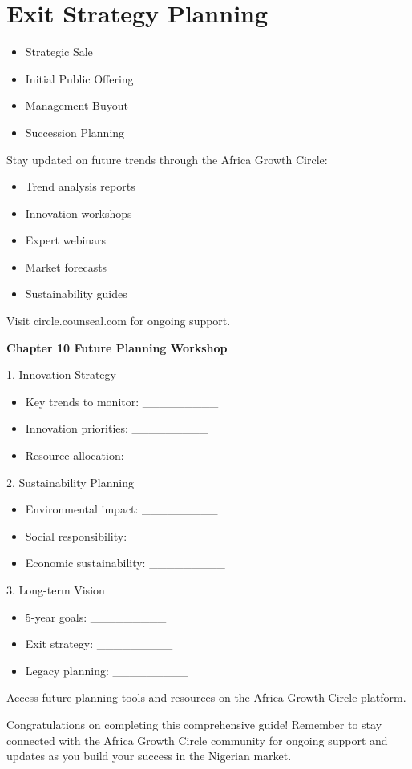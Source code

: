 \section{Exit Strategy Planning}

\begin{tcolorbox}[colback=white,colframe=primarydark,title=\textbf{Exit Options Analysis}]
\begin{itemize}
    \item Strategic Sale
    \item Initial Public Offering
    \item Management Buyout
    \item Succession Planning
\end{itemize}
\end{tcolorbox}

\begin{communitybox}
Stay updated on future trends through the Africa Growth Circle:
\begin{itemize}
    \item Trend analysis reports
    \item Innovation workshops
    \item Expert webinars
    \item Market forecasts
    \item Sustainability guides
\end{itemize}
Visit circle.counseal.com for ongoing support.
\end{communitybox}

\begin{workshopbox}
\textbf{Chapter 10 Future Planning Workshop}

1. Innovation Strategy
\begin{itemize}
    \item Key trends to monitor: \_\_\_\_\_\_\_\_\_
    \item Innovation priorities: \_\_\_\_\_\_\_\_\_
    \item Resource allocation: \_\_\_\_\_\_\_\_\_
\end{itemize}

2. Sustainability Planning
\begin{itemize}
    \item Environmental impact: \_\_\_\_\_\_\_\_\_
    \item Social responsibility: \_\_\_\_\_\_\_\_\_
    \item Economic sustainability: \_\_\_\_\_\_\_\_\_
\end{itemize}

3. Long-term Vision
\begin{itemize}
    \item 5-year goals: \_\_\_\_\_\_\_\_\_
    \item Exit strategy: \_\_\_\_\_\_\_\_\_
    \item Legacy planning: \_\_\_\_\_\_\_\_\_
\end{itemize}

Access future planning tools and resources on the Africa Growth Circle platform.
\end{workshopbox}

\begin{importantbox}
Congratulations on completing this comprehensive guide! Remember to stay connected with the Africa Growth Circle community for ongoing support and updates as you build your success in the Nigerian market.
\end{importantbox}
